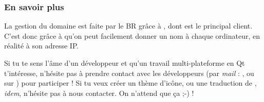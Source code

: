 \subsubsection{En savoir plus}

La gestion du domaine  est faite par le BR grâce à ,
dont  est le principal client. C'est donc grâce à  qu'on peut facilement
donner un nom à chaque ordinateur, en réalité à son adresse IP.

Si tu te sens l'âme d'un développeur et qu'un travail multi-plateforme en Q{}t t'intéresse, n'hésite pas à prendre contact avec les développeurs (par
\emph{mail} : , ou sur ) pour participer ! Si tu veux créer un thème d'icône, ou une traduction de
, \emph{idem}, n'hésite pas à nous contacter. On n'attend que ça ;-) !
